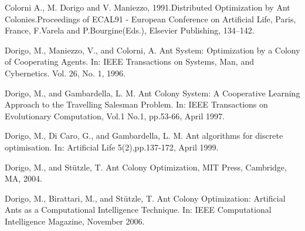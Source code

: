 \documentclass[10pt]{article}
\begin{document}
\begin{thebibliography}{9}
 



Colorni   A.,   M.   Dorigo   and   V.   Maniezzo,   1991.Distributed   Optimization   by   Ant   Colonies.Proceedings  of  ECAL91  -  European  Conference  on Artificial Life, Paris, France, F.Varela and P.Bourgine(Eds.), Elsevier Publishing, 134–142.

Dorigo,  M.,  Maniezzo,  V.,  and  Colorni,  A.  Ant  System:  Optimization  by  a  Colony  of Cooperating Agents. In: IEEE Transactions on Systems, Man, and Cybernetics. Vol. 26, No. 1, 1996.

Dorigo,  M.,  and  Gambardella,  L.  M.  Ant  Colony  System:  A  Cooperative  Learning Approach  to  the  Travelling  Salesman  Problem.  In: IEEE  Transactions  on  Evolutionary Computation, Vol.1 No.1, pp.53-66, April 1997.

Dorigo, M., Di Caro, G., and Gambardella, L. M. Ant algorithms for discrete optimisation. In: Artificial Life 5(2),pp.137-172, April 1999. 

Dorigo, M., and Stützle, T. Ant Colony Optimization, MIT Press, Cambridge, MA, 2004.

Dorigo,  M.,  Birattari,  M.,  and  Stützle,  T.  Ant Colony  Optimization:  Artificial  Ants  as  a Computational   Intelligence   Technique.  In: IEEE  Computational  Intelligence  Magazine, November 2006.


\end{thebibliography}
\end{document}
